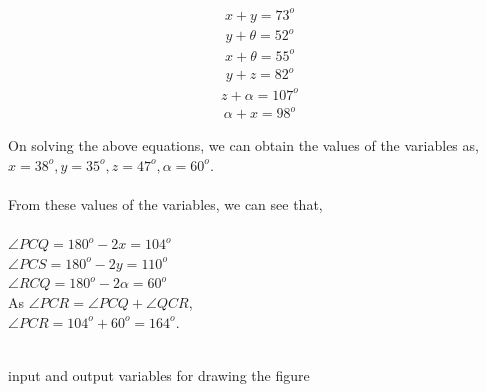 \documentclass[journal,12pt,twocolumn]{IEEEtran}
\begin{document}
\begin{align}
    x + y = 73^o
\end{align}
\begin{align}
    y + \theta = 52^o
\end{align}
\begin{align}
    x + \theta = 55^o
\end{align}
\begin{align}
    y + z = 82^o
\end{align}
\begin{align}
    z + \alpha = 107^o
\end{align}
\begin{align}
    \alpha + x = 98^o
\end{align}

On solving the above equations, we can obtain the values of the variables as, $x = 38^o, y = 35^o, z = 47^o, \alpha = 60^o .$\\\\
From these values of the variables, we can see that,\\\\
$\angle PCQ = 180^o - 2x = 104^o$\\
$\angle PCS = 180^o - 2y = 110^o$\\
$\angle RCQ = 180^o - 2\alpha = 60^o$\\
As $\angle PCR = \angle PCQ +\angle QCR$,\\ $\angle PCR = 104^o + 60^o = 164^o$.\\\\

\begin{table}[ht]
    \centering
    
    \caption{input and output variables for drawing the figure}
\end{table}
\end{document}

